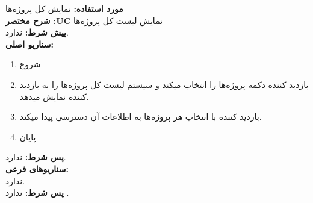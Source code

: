 \documentclass[20pt,a5paper]{report}
\begin{document}
\noindent \textbf{مورد استفاده:}
نمایش کل پروژه‌ها
\\
\textbf{شرح مختصر :UC}
نمایش لیست کل پروژه‌ها
\\
\textbf{پيش شرط:}
ندارد.
\\
\textbf{سناريو اصلی:}
\begin{enumerate}
\item
شروع
\item
بازدید کننده دکمه پروژه‌ها را انتخاب میکند و سیستم لیست کل پروژه‌ها را به بازدید کننده نمایش میدهد.
\item
بازدید کننده با انتخاب هر پروژه‌ها به اطلاعات آن دسترسی پیدا میکند.
\item
پایان
\end{enumerate}
\textbf{پس شرط:}
ندارد.
\\
\textbf{سناريوهای فرعی:}
\\
ندارد.
\\
\textbf{پس شرط:}
ندارد .


\centering
\vfill
\lr{\LaTeX}
\end{document}
